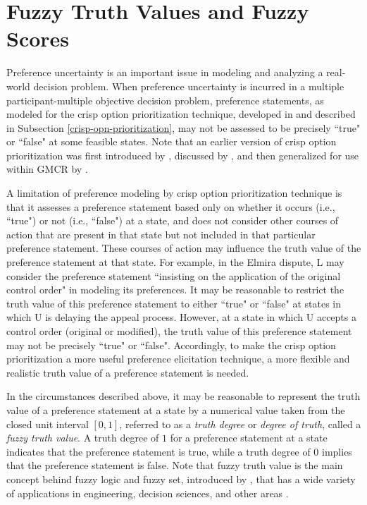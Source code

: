 \section{Fuzzy Truth Values and Fuzzy Scores}\label{sec-ftv-fs}

Preference uncertainty is an important issue in modeling and analyzing a real-world decision problem. When preference uncertainty is incurred in a multiple participant-multiple objective decision problem, preference statements, as modeled for the crisp option prioritization technique, developed in \citep{Peng-et-al1997, Peng1999, Fang-et-al2003} and described in Subsection \ref{crisp-opn-prioritization}, may not be assessed to be precisely ``true" or ``false" at some feasible states. Note that an earlier version of crisp option prioritization was first introduced by \citet{Fraser&Hipel1988}, discussed by \citet{Fraser1993, Fraser1994}, and then generalized for use within GMCR by \citet{Peng-et-al1997, Peng1999, Hipel-et-al1997, Fang-et-al2003}.

A limitation of preference modeling by crisp option prioritization technique is that it assesses a preference statement based only on whether it occurs (i.e., ``true") or not (i.e., ``false") at a state, and does not consider other courses of action that are present in that state but not included in that particular preference statement. These courses of action may influence the truth value of the preference statement at that state. For example, in the Elmira dispute, L may consider the preference statement ``insisting on the application of the original control order" in modeling its preferences. It may be reasonable to restrict the truth value of this preference statement to either ``true" or ``false" at states in which U is delaying the appeal process. However, at a state in which U accepts a control order (original or modified), the truth value of this preference statement may not be precisely ``true" or ``false". Accordingly, to make the crisp option prioritization a more useful preference elicitation technique, a more flexible and realistic truth value of a preference statement is needed.

In the circumstances described above, it may be reasonable to represent the truth value of a preference statement at a state by a numerical value taken from the closed unit interval $[0, 1]$, referred to as a \emph{truth degree} or \emph{degree of truth}, called a \emph{fuzzy truth value}. A truth degree of $1$ for a preference statement at a state indicates that the preference statement is true, while a truth degree of $0$ implies that the preference statement is false. Note that fuzzy truth value is the main concept behind fuzzy logic and fuzzy set, introduced by \citet{Zadeh1965}, that has a wide variety of applications in engineering, decision sciences, and other areas \citep{Bellman&Zadeh1970, Bojadziev&Bojadziev2007, Ross2010}.

